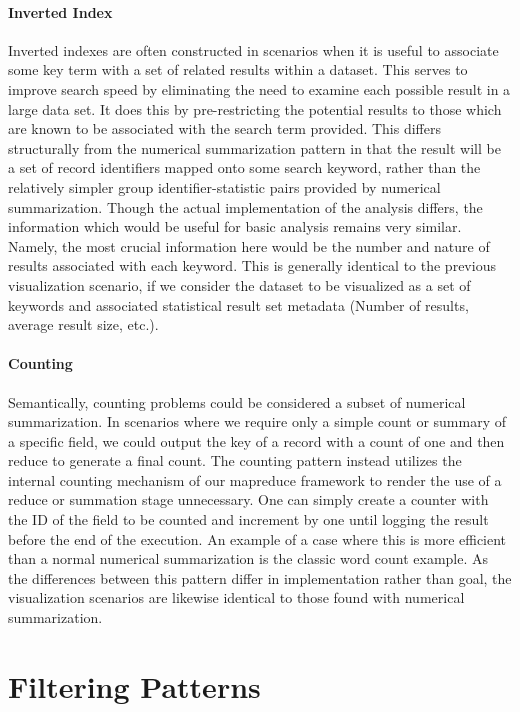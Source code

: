 \paragraph{Inverted Index}
Inverted indexes are often constructed in scenarios when it is useful to associate some key term with a set of related results within a dataset. This serves to improve search speed by eliminating the need to examine each possible result in a large data set. It does this by pre-restricting the potential results to those which are known to be associated with the search term provided. This differs structurally from the numerical summarization pattern in that the result will be a set of record identifiers mapped onto some search keyword, rather than the relatively simpler group identifier-statistic pairs provided by numerical summarization. Though the actual implementation of the analysis differs, the information which would be useful for basic analysis remains very similar. Namely, the most crucial information here would be the number and nature of results associated with each keyword. This is generally identical to the previous visualization scenario, if we consider the dataset to be visualized as a set of keywords and associated statistical result set metadata (Number of results, average result size, etc.).  

\paragraph{Counting}
Semantically, counting problems could be considered a subset of numerical summarization. In scenarios where we require only a simple count or summary of a specific field, we could output the key of a record with a count of one and then reduce to generate a final count. The counting pattern instead utilizes the internal counting mechanism of our mapreduce framework to render the use of a reduce or summation stage unnecessary. One can simply create a counter with the ID of the field to be counted and increment by one until logging the result before the end of the execution. An example of a case where this is more efficient than a normal numerical summarization is the classic word count example. As the differences between this pattern differ in implementation rather than goal, the visualization scenarios are likewise identical to those found with numerical summarization. 

\section{Filtering Patterns}
\label{sec:filtering}

